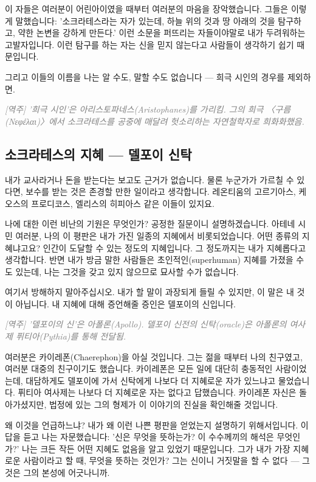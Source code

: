\documentclass[11pt, a4paper]{article}
\newcommand{\tnote}[1]{\par\noindent\textit{\textcolor{gray}{[역주] #1}}\par\smallskip}
\begin{document}
이 자들은 여러분이 어린아이였을 때부터 여러분의 마음을 장악했습니다. 그들은 이렇게 말했습니다: '소크라테스라는 자가 있는데, 하늘 위의 것과 땅 아래의 것을 탐구하고, 약한 논변을 강하게 만든다.' 이런 소문을 퍼뜨리는 자들이야말로 내가 두려워하는 고발자입니다. 이런 탐구를 하는 자는 신을 믿지 않는다고 사람들이 생각하기 쉽기 때문입니다.


그리고 이들의 이름을 나는 알 수도, 말할 수도 없습니다 — 희극 시인의 경우를 제외하면.


\tnote{'희극 시인'은 아리스토파네스(Aristophanes)를 가리킴. 그의 희극 〈구름(Νεφέλαι)〉에서 소크라테스를 공중에 매달려 헛소리하는 자연철학자로 희화화했음.}


\bigskip


\subsection{소크라테스의 지혜 — 델포이 신탁}


내가 교사라거나 돈을 받는다는 보고도 근거가 없습니다. 물론 누군가가 가르칠 수 있다면, 보수를 받는 것은 존경할 만한 일이라고 생각합니다. 레온티움의 고르기아스, 케오스의 프로디코스, 엘리스의 히피아스 같은 이들이 있지요.


나에 대한 이런 비난의 기원은 무엇인가? 공정한 질문이니 설명하겠습니다. 아테네 시민 여러분, 나의 이 평판은 내가 가진 일종의 지혜에서 비롯되었습니다. 어떤 종류의 지혜냐고요? 인간이 도달할 수 있는 정도의 지혜입니다. 그 정도까지는 내가 지혜롭다고 생각합니다. 반면 내가 방금 말한 사람들은 초인적인(superhuman) 지혜를 가졌을 수도 있는데, 나는 그것을 갖고 있지 않으므로 묘사할 수가 없습니다.


여기서 방해하지 말아주십시오. 내가 할 말이 과장되게 들릴 수 있지만, 이 말은 내 것이 아닙니다. 내 지혜에 대해 증언해줄 증인은 델포이의 신입니다.


\tnote{'델포이의 신'은 아폴론(Apollo). 델포이 신전의 신탁(oracle)은 아폴론의 여사제 퓌티아(Pythia)를 통해 전달됨.}


여러분은 카이레폰(Chaerephon)을 아실 것입니다. 그는 젊을 때부터 나의 친구였고, 여러분 대중의 친구이기도 했습니다. 카이레폰은 모든 일에 대단히 충동적인 사람이었는데, 대담하게도 델포이에 가서 신탁에게 나보다 더 지혜로운 자가 있느냐고 물었습니다. 퓌티아 여사제는 나보다 더 지혜로운 자는 없다고 답했습니다. 카이레폰 자신은 돌아가셨지만, 법정에 있는 그의 형제가 이 이야기의 진실을 확인해줄 것입니다.


왜 이것을 언급하느냐? 내가 왜 이런 나쁜 평판을 얻었는지 설명하기 위해서입니다. 이 답을 듣고 나는 자문했습니다: '신은 무엇을 뜻하는가? 이 수수께끼의 해석은 무엇인가?' 나는 크든 작든 어떤 지혜도 없음을 알고 있었기 때문입니다. 그가 내가 가장 지혜로운 사람이라고 할 때, 무엇을 뜻하는 것인가? 그는 신이니 거짓말을 할 수 없다 — 그것은 그의 본성에 어긋나니까.
\end{document}
